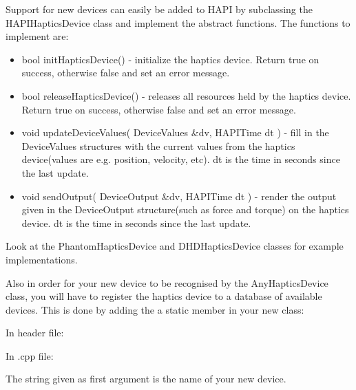 Support for new devices can easily be added to HAPI by subclassing the
HAPIHapticsDevice class and implement the abstract functions. The
functions to implement are:

\begin{itemize}
\item bool initHapticsDevice() - initialize the haptics device. Return
  true on success, otherwise false and set an error message. 
\item bool releaseHapticsDevice() - releases all resources held by the
  haptics device. Return true on success, otherwise false and set an
  error message. 
\item void updateDeviceValues( DeviceValues \&dv, HAPITime dt ) - fill
  in the DeviceValues structures with the current values from the
  haptics device(values are e.g. position, velocity, etc). dt is the
  time in seconds since the last update.
\item void sendOutput( DeviceOutput \&dv, HAPITime dt ) - render the
  output given in the DeviceOutput structure(such as force and torque)
  on the haptics device. dt is the time in seconds since the last update.
\end{itemize}

Look at the PhantomHapticsDevice and DHDHapticsDevice classes for
example implementations. 

Also in order for your new device to be recognised by the
AnyHapticsDevice class, you will have to register the haptics device
to a database of available devices. This is done by adding the a
static member in your new class:

In header file:



In .cpp file:



The string given as first argument is the name of your new device.

